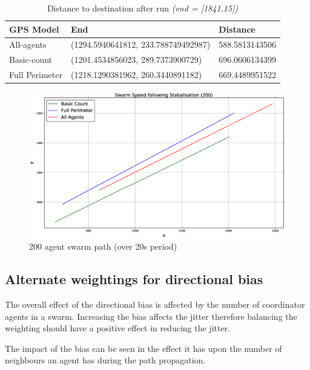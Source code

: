\begin{table}[H]
\begin{center}
\begin{tabular}{| l | l | l |}
\hline
GPS Model & End & Distance \\ \hline
All-agents & (1294.5940641812, 233.788749492987) & 588.5813143506\\ \hline
Basic-count & (1201.4534856023, 289.7373900729) & 696.0606134399\\ \hline
Full Perimeter & (1218.1290381962, 260.3440891182) & 669.4489951522\\ \hline
\end{tabular}\caption[Distance to destination after run]{Distance to destination after run \textit{(end = [1841,15])}}\label{tab:SwarmDistanceEnd}
\end{center}
\end{table}

\begin{figure}[H]
\begin{center}
\includegraphics[width=14cm]{CHAPTER-6/figures/SwarmSpeed1}
\end{center}
\caption{200 agent swarm path (over 20s period)\label{fig:SwarmSpeed1}}
\end{figure}

\subsection{Alternate weightings for directional bias}\label{sec:AlternateBias1}
The overall effect of the directional bias is affected by the number of coordinator agents in a swarm. Increasing the bias affects the jitter therefore balancing the weighting should have a positive effect in reducing the jitter.

The impact of the bias can be seen in the effect it has upon the number of neighbours an agent has during the path propagation.

